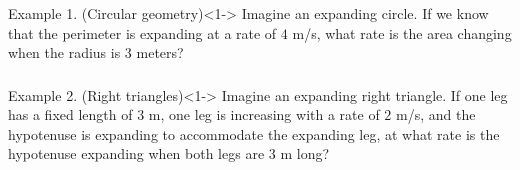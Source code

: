 \documentclass[10pt,t,handout,ignorenonframetext,aspectratio=169]{beamer}
\begin{document}
\begin{frame}[t]
  \frametitle{}
  \vs
  \begin{block}{Example 1. (Circular geometry)}<1->
    Imagine an expanding circle. If we know that the perimeter is
    expanding at a rate of $4$ m/s, what rate is the area changing
    when the radius is $3$ meters?
  \end{block}

  \begin{figure}
    \hfill
  \end{figure}
\end{frame}
\begin{frame}\end{frame}

\begin{frame}[t]
  \frametitle{}
  \vs
  \begin{block}{Example 2. (Right triangles)}<1->
    Imagine an expanding right triangle. If one leg has a fixed length
    of $3$ m, one leg is increasing with a rate of $2$ m/s, and the
    hypotenuse is expanding to accommodate the expanding leg, at what
    rate is the hypotenuse expanding when both legs are $3$ m long?
  \end{block}

  \begin{figure}
    \hfill
  \end{figure}
\end{frame}
\begin{frame}\end{frame}
\end{document}
